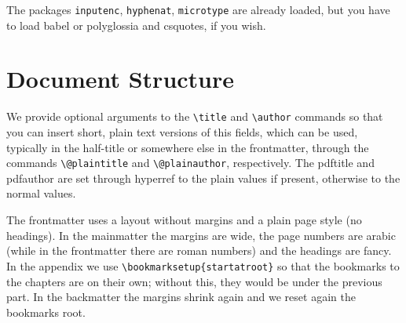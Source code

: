 
The packages \verb|inputenc|, \verb|hyphenat|, \verb|microtype| are 
already loaded, but you have to load babel or polyglossia and csquotes, 
if you wish.

\section{Document Structure}

We provide optional arguments to the \verb|\title| and \verb|\author| 
commands so that you can insert short, plain text versions of this 
fields, which can be used, typically in the half-title or somewhere else 
in the frontmatter, through the commands \verb|\@plaintitle| and 
\verb|\@plainauthor|, respectively. The pdftitle and pdfauthor are set 
through hyperref to the plain values if present, otherwise to the normal 
values.

The frontmatter uses a layout without margins and a plain page style 
(\ie no headings). In the mainmatter the margins are wide, the page 
numbers are arabic (while in the frontmatter there are roman numbers) 
and the headings are fancy. In the appendix we use 
\verb|\bookmarksetup{startatroot}| so that the bookmarks to the chapters 
are on their own; without this, they would be under the previous part. 
In the backmatter the margins shrink again and we reset again the 
bookmarks root.
